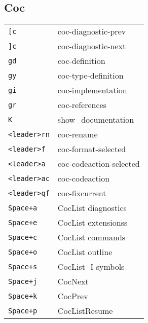 \begin{multicols}{3}
\section{Coc}
\begin{tabular}{@{}ll@{}}
	\verb![c! & coc-diagnostic-prev \\
	\verb!]c! & coc-diagnostic-next \\
	\verb!gd! & coc-definition  \\
	\verb!gy! & coc-type-definition \\
	\verb!gi! & coc-implementation \\
	\verb!gr! & coc-references  \\
	\verb!K! & show\_documentation \\
	\verb!<leader>rn! & coc-rename \\
	\verb!<leader>f ! & coc-format-selected \\
	\verb!<leader>a ! & coc-codeaction-selected \\
	\verb!<leader>ac! & coc-codeaction \\
    \verb!<leader>qf! & coc-fixcurrent \\
	\verb!Space+a! & CocList diagnostics \\
	\verb!Space+e! & CocList extensionss \\
	\verb!Space+c! & CocList commands \\
	\verb!Space+o! & CocList outline \\
	\verb!Space+s! & CocList -I symbols \\
	\verb!Space+j! & CocNext        \\
	\verb!Space+k! & CocPrev        \\
	\verb!Space+p! & CocListResume  \\
\end{tabular}


\end{multicols}
